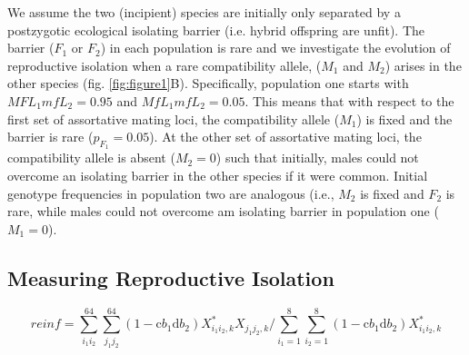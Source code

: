 \documentclass[11pt]{article}
\begin{document}
We assume the two (incipient) species are initially only separated by a postzygotic ecological isolating barrier (i.e. hybrid offspring are unfit).  The barrier ($F_1$ or $F_2$) in each population is rare and we investigate the evolution of reproductive isolation when a rare compatibility allele, ($M_1$ and $M_2$) arises in the other species (fig. \ref{fig:figure1}B).  Specifically, population one starts with $M F L_1 m f L_2 = 0.95$ and $M f L_1 m f L_2 = 0.05$. This means that with respect to the first set of assortative mating loci, the compatibility allele ($M_1$) is fixed and the barrier is rare ($p_{F_1} = 0.05$). At the other set of assortative mating loci, the compatibility allele is absent ($M_2 = 0$) such that initially, males could not overcome an isolating barrier in the other species if it were common.  Initial genotype frequencies in population two are analogous (i.e., $M_2$ is fixed and $F_2$ is rare, while males could not overcome am isolating barrier in population one ($M_1 = 0$). 

\subsection*{Measuring Reproductive Isolation}
\begin{equation}\label{Eq:eq4}
reinf = \sum_{i_1 i_2}^{64} \sum_{j_1 j_2}^{64} (1 - \text{c} b_1 \text{d} b_2) X^*_{i_1 i_2, k} X_{j_1 j_2, k}/ \sum_{i_1 =1}^{8} \sum_{i_2=1}^{8} (1 - \text{c} b_1 \text{d} b_2) X^*_{i_1 i_2, k}
\end{equation}  

\newpage


\end{document}
